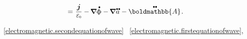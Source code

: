 \begin{multline}
= \hspace{.1ex} \displaystyle \frac{\currentdensity}{\raisemath{.16em}{\vacuumpermittivity}} - \hspace{-0.15ex} \boldnabla \mathdotabove{\upphi} - \hspace{-0.15ex} \boldnabla \hspace{.1ex} \mathdotdotabove{a} \hspace{.1ex} - \mathdotdotabove{\boldmathbb{A}}
\hspace{.2ex} .
\end{multline}

   ~\eqref{electromagnetic.secondequationofwave} ~\eqref{electromagnetic.firstequationofwave}, 

